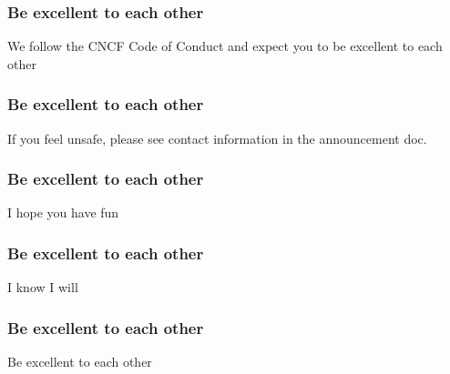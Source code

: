 \documentclass[aspectratio=169]{beamer}
\begin{document}
\begin{frame}
	\frametitle{Be excellent to each other}
	\centering
	\vfill
	We follow the CNCF Code of Conduct and expect you to be excellent to each other
	\vfill
\end{frame}

\begin{frame}
	\frametitle{Be excellent to each other}
	\centering
	\vfill
	If you feel unsafe, please see contact information in the announcement doc.
	\vfill
\end{frame}

\begin{frame}
	\frametitle{Be excellent to each other}
	\centering
	\vfill
	I hope you have fun
	\vfill
\end{frame}

\begin{frame}
	\frametitle{Be excellent to each other}
	\centering
	\vfill
	I know I will
	\vfill
\end{frame}

\begin{frame}
	\frametitle{Be excellent to each other}
	\centering
	\vfill
	Be excellent to each other
	\vfill
\end{frame}
\end{document}
